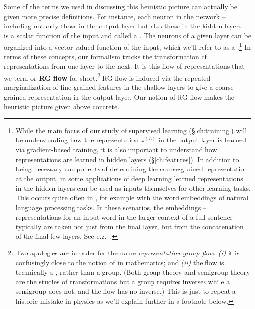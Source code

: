 Some of the terms we used in discussing this heuristic picture can actually be given more precise definitions. For instance, each neuron in the network -- including not only those in the output layer but also those in the hidden layers -- is a scalar function of the input and called a . The neurons of a given layer can be organized into a vector-valued function of the input, which we'll refer to as a .\footnote{While the main focus of our study of supervised learning (\S\ref{ch:training}) will be understanding how the representation $z^{(L)}$ in the output layer is learned via gradient-based training,
it is also important to understand how representations 
are learned in hidden layers (\S\ref{ch:features}). In addition to being necessary components of determining the coarse-grained representation at the output,
in some applications of deep learning learned representations in the hidden layers can be used as inputs themselves for other learning tasks. This occurs quite often in , for example with the word embeddings of natural language processing tasks. In these scenarios, the embeddings -- representations for an input word in the larger context of a full sentence -- typically are taken not just from the final layer, but from the concatenation of the final few layers. See e.g.~\cite{BERT2018}.}
In terms of these concepts, our formalism tracks the transformation of representations from one layer to the next. It is this flow of representations that we term  or \textbf{RG flow} for short.\footnote{
Two apologies are in order for the name \emph{representation group flow}: \emph{(i)} it is confusingly close to the notion of  in mathematics; and \emph{(ii)} the flow is technically a , rather than a group. (Both group theory and semigroup theory are the studies of transformations but a group requires inverses while a semigroup does not; and the flow has no inverse.) 
This is just to repeat a historic mistake in physics as we'll explain further in a footnote below.} 
RG flow is induced via the repeated marginalization of fine-grained features in the shallow layers to give a coarse-grained representation in the output layer. Our notion of RG flow makes the heuristic picture given above concrete. %




 




